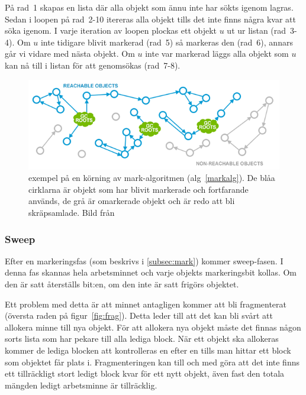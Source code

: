 \documentclass[12pt,a4paper]{article}
\begin{document}
På rad~1 skapas en lista där alla objekt som ännu inte har sökts
igenom lagras. Sedan i loopen på rad~2-10 itereras alla objekt tills
det inte finns några kvar att söka igenom. I varje iteration av loopen
plockas ett objekt $u$ ut ur listan (rad~3-4). Om $u$ inte tidigare
blivit markerad (rad~5) så markeras den (rad~6), annars går vi vidare
med nästa objekt. Om $u$ inte var markerad läggs alla objekt som $u$
kan nå till i listan för att genomsökas (rad~7-8).

\begin{figure}[H]
  \centering
  \includegraphics[width=1\textwidth]{mark_and_sweep.png}
  \caption{exempel på en körning av mark-algoritmen (alg~\ref{markalg}). De blåa cirklarna är objekt som har blivit markerade och fortfarande används, de grå är omarkerade objekt och är redo att bli skräpsamlade. Bild från \cite{plumbr1}}
  \label{fig:alg1}
\end{figure}

\subsubsection{Sweep}
\label{subsec:sweep}

Efter en markeringsfas (som beskrivs i \ref{subsec:mark}) kommer
sweep-fasen. I denna fas skannas hela arbetsminnet och varje objekts
markeringsbit kollas. Om den är satt återställs bit:en, om den inte är
satt frigörs objektet.

Ett problem med detta är att minnet antagligen kommer att bli
fragmenterat (översta raden på figur~\ref{fig:frag}). Detta leder till
att det kan bli svårt att allokera minne till nya objekt. För att
allokera nya objekt måste det finnas någon sorts lista som har pekare
till alla lediga block. När ett objekt ska allokeras kommer de lediga
blocken att kontrolleras en efter en tills man hittar ett block som
objektet får plats i. Fragmenteringen kan till och med göra att det
inte finns ett tillräckligt stort ledigt block kvar för ett nytt
objekt, även fast den totala mängden ledigt arbetsminne är
tillräcklig.
\end{document}
